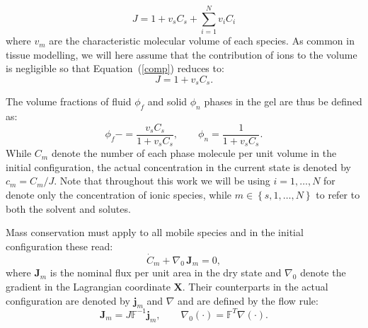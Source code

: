 \documentclass[runningheads]{llncs}
\newcommand{\F}{\ensuremath{\mathbb{F}}}
\begin{document}
\begin{equation}
 J= 1 + v_s C_s +\sum\limits_{i=1}^{N} v_i C_i
 \label{comp}
\end{equation}
where $v_m$ are the characteristic molecular volume of each species. As common in tissue modelling, we will here assume that the contribution of ions to the volume is negligible so that Equation~(\ref{comp}) reduces to:
\begin{equation}
J=1+v_s C_s.
\end{equation} 

The volume fractions of fluid $\phi_f$ and solid $\phi_n$ phases in the gel are thus be defined as:
\begin{equation}
\phi_f -= \frac{v_sC_s}{1+v_sC_s}, \qquad \phi_n = \frac{1}{1+v_sC_s}.
\end{equation}
While $C_m$ denote the number of each phase molecule per unit volume in the initial configuration, the actual concentration in the current state is denoted by $c_m=C_m/J$. Note that throughout this work we will be using $i=1,\ldots,N$ for denote only the concentration of ionic species, while $m\in\left\{s,1,\ldots,N\right\}$ to refer to both the solvent and solutes.

Mass conservation must apply to all mobile species and in the initial configuration these read:
\begin{equation}
\dot{C}_m + \nabla_0 \, \mathbf{J}_m = 0, 
\end{equation}
where $\mathbf{J}_m$ is the nominal flux per unit area in the dry state and $\nabla_0$ denote the gradient in the Lagrangian coordinate $\mathbf{X}$. Their counterparts in the actual configuration are denoted by $\mathbf{j}_m$ and $\nabla$ and are defined by the flow rule:
\begin{equation}
\mathbf{J}_m = J \F^{-1} \mathbf{j}_m, \qquad \nabla_0 (\cdot) = \F^{T} \nabla(\cdot).
\end{equation}



%
\end{document}
